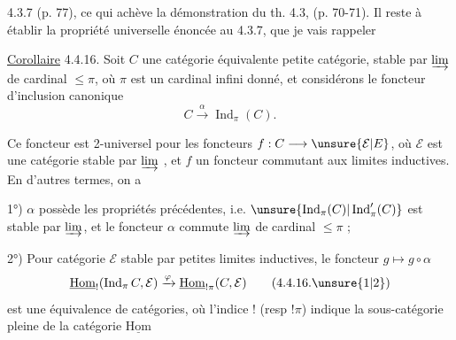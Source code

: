 4.3.7 (p. 77), ce qui achève la démonstration du th. 4.3, (p. 70-71). Il reste à établir la propriété universelle énoncée au 4.3.7, que je vais rappeler

\uline{Corollaire} 4.4.16. Soit $C$ une catégorie équivalente  petite catégorie, stable par $\varinjlim$ de cardinal $\leq\pi$, où $\pi$ est un cardinal infini donné, et considérons le foncteur d'inclusion canonique
\[
 C\xrightarrow{\alpha}\operatorname{Ind}_\pi(C).\tag*{(4.4.16.1)}
\]

Ce foncteur est 2-universel pour les foncteurs $f:C\longrightarrow\unsure{\mathcal E|E}$, où $\mathcal E$ est une catégorie stable par  $\varinjlim$ , et $f$ un foncteur commutant aux limites inductives. En d'autres termes, on a

1°) $\alpha$ possède les propriétés précédentes, i.e. $\unsure{\operatorname{Ind}_\pi(C)|\operatorname{Ind}'_\pi(C)}$ est stable par $\varinjlim$,  et le foncteur $\alpha$ commute  $\varinjlim$ de  cardinal $\leq\pi$ ;

2°) Pour  catégorie $\mathcal E$ stable par petites limites inductives, le foncteur $g\longmapsto g\circ\alpha$
\[
\underline{\mathrm{Hom}}_{!}(\operatorname{Ind}_\pi C,\mathcal E)\xrightarrow{\varphi}\underline{\mathrm{Hom}}_{!\pi}(C,\mathcal E)\tag*{(4.4.16.\unsure{1|2})}
\]
est une équivalence de catégories, où l'indice $!$ (resp $!\pi$) indique la sous-catégorie  pleine de la catégorie $\underline{\mathrm{Hom}}$
